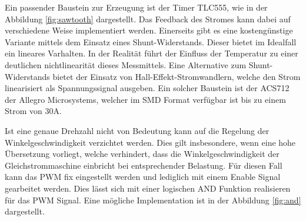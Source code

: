 Ein passender Baustein zur Erzeugung ist der Timer TLC555, wie in der
Abbildung \ref{fig:sawtooth} dargestellt. Das Feedback des Stromes kann
dabei auf verschiedene Weise implementiert werden. Einerseits gibt es eine
kostengünstige Variante mittels dem Einsatz eines Shunt-Widerstands. Dieser
bietet im Idealfall ein lineares Varhalten. In der Realität führt der
Einfluss der Temperatur zu einer deutlichen nichtlinearität dieses
Messmittels. Eine Alternative zum Shunt-Widerstands bietet der Einsatz von
Hall-Effekt-Stromwandlern, welche den Strom linearisiert als Spannungssignal
ausgeben. Ein solcher Baustein ist der ACS712 der Allegro Microsystems,
welcher im SMD Format verfügbar ist bis zu einem Strom von 30A.

Ist eine genaue Drehzahl nicht von Bedeutung kann auf die Regelung der
Winkelgeschwindigkeit verzichtet werden. Dies gilt insbesondere, wenn eine
hohe Übersetzung vorliegt, welche verhindert, dass die Winkelgeschwindigkeit
der Gleichstrommaschine einbricht bei entsprechender Belastung. Für diesen
Fall kann das PWM fix eingestellt werden und lediglich mit einem Enable
Signal gearbeitet werden. Dies lässt sich mit einer logischen AND Funktion
realisieren für das PWM Signal. Eine mögliche Implementation ist in der
Abbildung \ref{fig:and} dargestellt.

